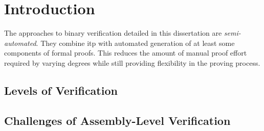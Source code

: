 \chapter{Introduction}
The approaches to binary verification detailed in this dissertation
are \emph{semi-automated}.
They combine \ac{itp} with automated generation
of at least some components of formal proofs.
This reduces the amount of manual proof effort required by varying degrees
while still providing flexibility in the proving process.

\section{Levels of Verification}  
\section{Challenges of Assembly-Level Verification}
